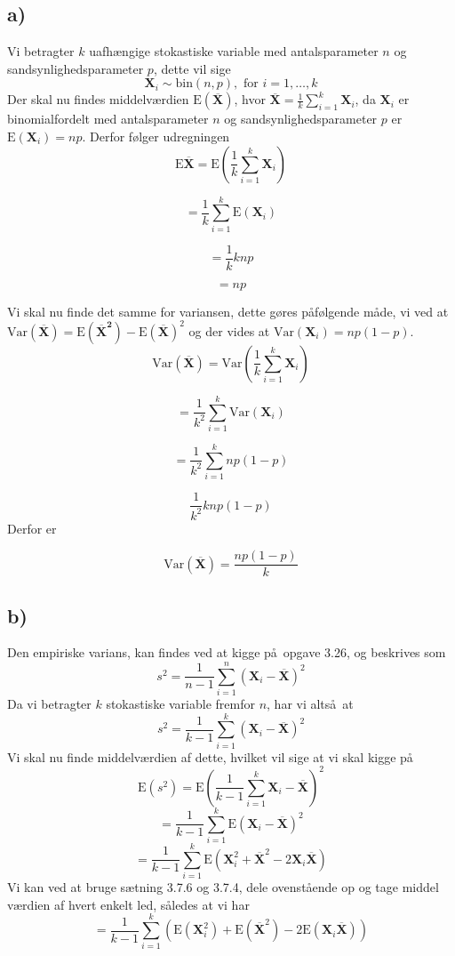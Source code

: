\documentclass[a4paper,11pt]{article}
\begin{document}
\newcommand{\ud}{\, \mathrm{d}}
\newcommand{\mb}[1]{\mathbf{#1}}
\newcommand{\tr}[1]{\textrm{#1}}
\newcommand{\indep}{{\;\bot\!\!\!\!\!\!\bot\;}}

\newenvironment{nospace}%
{\noindent\ignorespaces}%
{\par\noindent%
  \ignorespacesafterend}
\subsection*{a)}
Vi betragter $k$ uafh\ae ngige stokastiske variable med antalsparameter $n$ og sandsynlighedsparameter $p$, dette vil sige
\[
\mb{X}_i \sim{ \tr{bin} \left( n,p \right) } , \tr{ for } i = 1,\dots,k
\]
Der skal nu findes middelv\ae rdien $\tr{E}(\overline{\mb{X}})$, hvor $\overline{\mb{X}} = \frac{1}{k} \sum_{i = 1}^k \mb{X}_i$, da $\mb{X}_i$ er binomialfordelt med antalsparameter $n$ og sandsynlighedsparameter $p$ er $\tr{E}(\mb{X}_i) = np$. Derfor f\o lger udregningen
\[
\tr{E}\mb{\overline{X}} = \tr{E} \left(\frac{1}{k}\sum_{i = 1}^k \mb{X}_i \right)
\]

\[
= \frac{1}{k}\sum_{i = 1}^k \tr{E}(\mb{X}_i)
\]

\[
= \frac{1}{k}k np
\]

\[
= np
\]

Vi skal nu finde det samme for variansen, dette g\o res p\aa f\o lgende m\aa de, vi ved at $\tr{Var}(\mb{\overline{X}}) = \tr{E}(\mb{\overline{X}^2}) - \tr{E}(\mb{\overline{X}})^2$ og der vides at $\tr{Var}(\mb{X}_i) = np(1-p)$.
\[
\tr{Var}(\mb{\overline{X}}) = \tr{Var}(\frac{1}{k} \sum_{i = 1}^k \mb{X}_i)
\]

\[
= \frac{1}{k^2} \sum_{i = 1}^k \tr{Var}(\mb{X}_i)
\]

\[
=\frac{1}{k^2} \sum_{i = 1}^k np(1-p)
\]

\[
\frac{1}{k^2} k np(1-p)
\]
Derfor er

\[
\tr{Var}(\mb{\overline{X}}) = \frac{np(1-p)}{k}
\]

\subsection*{b)}
Den empiriske varians, kan findes ved at kigge p\aa\ opgave 3.26, og beskrives som
\[
s^2 = \frac{1}{n-1}\sum_{i = 1}^{n}\left(\mb{X}_i - \mb{\overline{X}}\right)^2
\]
Da vi betragter $k$ stokastiske variable fremfor $n$, har vi alts\aa\ at
\[
s^2 = \frac{1}{k-1}\sum_{i = 1}^{k}\left(\mb{X}_i - \mb{\overline{X}}\right)^2
\]
Vi skal nu finde middelv\ae rdien af dette, hvilket vil sige at vi skal kigge p\aa
\[
\tr{E}(s^2) = \tr{E}\left( \frac{1}{k-1}\sum_{i = 1}^{k}\mb{X}_i - \mb{\overline{X}}\right)^2
\]
\[
= \frac{1}{k-1}\sum_{i = 1}^{k} \tr{E}\left(\mb{X}_i - \mb{\overline{X}} \right)^{2}
\]
\[
= \frac{1}{k-1}\sum_{i = 1}^{k} \tr{E}\left(\mb{X}_{i}^{2} + \mb{\overline{X}}^{2} - 2\mb{X}_i\mb{\overline{X}} \right)
\]
Vi kan ved at bruge s\ae tning 3.7.6 og 3.7.4, dele ovenst\aa ende op og tage middel v\ae rdien af hvert enkelt led, s\aa ledes at vi har
\[
= \frac{1}{k-1} \sum_{i = 1}^{k} \left( \tr{E} \left( \mb{X}_{i}^{2} \right) + \tr{E} \left( \mb{\overline{X}}^{2} \right) - 2 \tr{E} \left( \mb{X}_i \mb{\overline{X}} \right) \right)
\]
\end{document}
